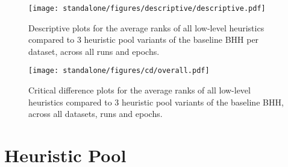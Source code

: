 \begin{figure}[htbp]
	\centering
	\texttt{[image: standalone/figures/descriptive/descriptive.pdf]}
	\caption{Descriptive plots for the average ranks of all low-level heuristics compared to 3 heuristic pool variants of the baseline \Acs{BHH} per dataset, across all runs and epochs.}
	\label{fig:results:standalone:descriptive:descriptive}
\end{figure}


\begin{figure}[htbp]
	\centering
	\texttt{[image: standalone/figures/cd/overall.pdf]}
	\caption{Critical difference plots for the average ranks of all low-level heuristics compared to 3 heuristic pool variants of the baseline \acs{BHH}, across all datasets, runs and epochs.}
	\label{fig:results:standalone:descriptive:cd}
\end{figure}

\section{Heuristic Pool}\label{sec:results:bhh_variant_hp}


